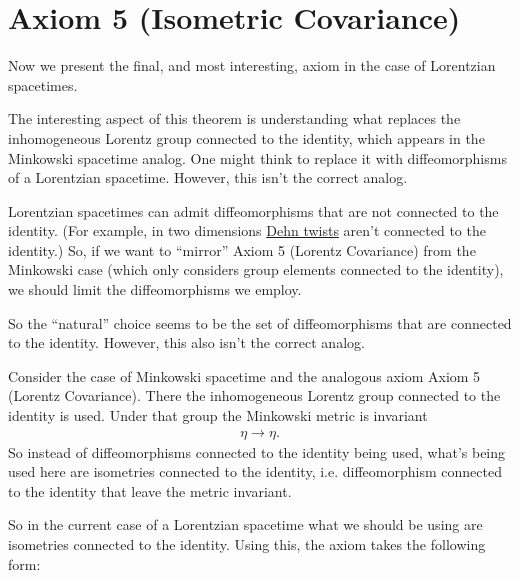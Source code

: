 \section{Axiom 5 (Isometric Covariance)}\label{sctn:axiom-5-(isometric-covariance)}
Now we present the final, and most interesting, axiom in the case of Lorentzian spacetimes.

The interesting aspect of this theorem is understanding what replaces the inhomogeneous Lorentz group connected to the identity, which appears in the Minkowski spacetime analog. One might think to replace it with diffeomorphisms of a Lorentzian spacetime. However, this isn't the correct analog.

Lorentzian spacetimes can admit diffeomorphisms that are not connected to the identity. (For example, in two dimensions \href{https://en.wikipedia.org/wiki/Dehn_twist}{Dehn twists} aren't connected to the identity.) So, if we want to ``mirror'' Axiom 5 (Lorentz Covariance) from the Minkowski case (which only considers group elements connected to the identity), we should limit the diffeomorphisms we employ.

So the ``natural'' choice seems to be the set of diffeomorphisms that are connected to the identity. However, this also isn't the correct analog.

Consider the case of Minkowski spacetime and the analogous axiom Axiom 5 (Lorentz Covariance). There the inhomogeneous Lorentz group connected to the identity is used. Under that group the Minkowski metric is invariant
\begin{align}
    \eta \longrightarrow \eta.
\end{align}
So instead of diffeomorphisms connected to the identity being used, what's being used here are isometries connected to the identity, i.e. diffeomorphism connected to the identity that leave the metric invariant.

So in the current case of a Lorentzian spacetime what we should be using are isometries connected to the identity. Using this, the axiom takes the following form:

